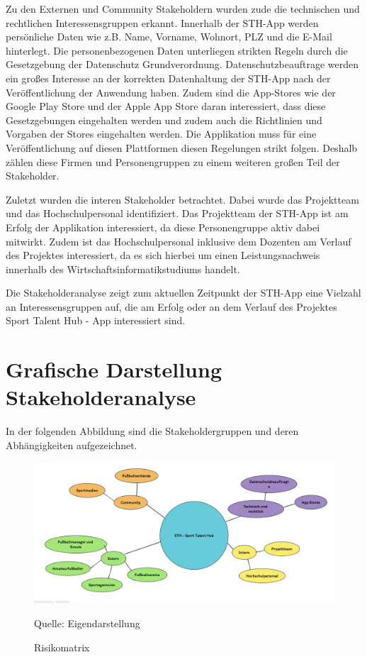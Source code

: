 \noindent
Zu den Externen und Community Stakeholdern wurden zude die technischen und rechtlichen Interessensgruppen erkannt.
Innerhalb der STH-App werden persönliche Daten wie z.B. Name, Vorname, Wohnort, PLZ und die E-Mail hinterlegt.
Die personenbezogenen Daten unterliegen strikten Regeln durch die Gesetzgebung der Datenschutz Grundverordnung.
Datenschutzbeauftrage werden ein großes Interesse an der korrekten Datenhaltung der STH-App nach der Veröffentlichung der Anwendung haben.
Zudem sind die App-Stores wie der Google Play Store und der Apple App Store daran interessiert, dass diese Gesetzgebungen eingehalten werden und zudem auch die Richtlinien und Vorgaben der Stores eingehalten werden.
Die Applikation muss für eine Veröffentlichung auf diesen Plattformen diesen Regelungen strikt folgen.
Deshalb zählen diese Firmen und Personengruppen zu einem weiteren großen Teil der Stakeholder.

\noindent
Zuletzt wurden die interen Stakeholder betrachtet.
Dabei wurde das Projektteam und das Hochschulpersonal identifiziert.
Das Projektteam der STH-App ist am Erfolg der Applikation interessiert, da diese Personengruppe aktiv dabei mitwirkt.
Zudem ist das Hochschulpersonal inklusive dem Dozenten am Verlauf des Projektes interessiert, da es sich hierbei um einen Leistungsnachweis innerhalb des Wirtschaftsinformatikstudiums handelt.

\noindent
Die Stakeholderanalyse zeigt zum aktuellen Zeitpunkt der STH-App eine Vielzahl an Interessensgruppen auf, die am Erfolg oder an dem Verlauf des Projektes Sport Talent Hub - App interessiert sind.


\section{Grafische Darstellung Stakeholderanalyse}

In der folgenden Abbildung sind die Stakeholdergruppen und deren Abhängigkeiten aufgezeichnet.

\begin{figure}[H]
    \centering
    \includegraphics[width=1\textwidth]{assets/figures/stakeholderanalyse.png}
    \caption[Risikomatrix]{Risikomatrix}
    \begin{flushleft}
        Quelle: Eigendarstellung
    \end{flushleft}
\end{figure}

